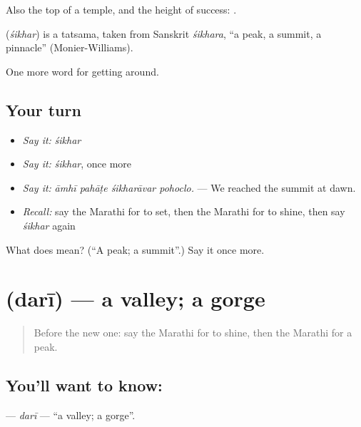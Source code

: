 Also the top of a temple, and the height of success:  .

\begin{cousinweb}
\textbf{} (\emph{śikhar}) is a tatsama, taken from Sanskrit \emph{śikhara}, \textquotedblleft{}a peak, a summit, a pinnacle\textquotedblright{} (Monier-Williams).
\end{cousinweb}

\begin{grammarlens}[title={What you've built}]
One more word for getting around.
\end{grammarlens}

\subsection*{Your turn}
\begin{itemize}
\raggedright
  \item \emph{Say it:} \emph{śikhar}
  \item \emph{Say it:} \emph{śikhar}, once more
  \item \emph{Say it:} \emph{āmhī pahāṭe śikharāvar pohoclo.} — We reached the summit at dawn.
  \item \emph{Recall:} say the Marathi for to set, then the Marathi for to shine, then say \emph{śikhar} again
\end{itemize}

\begin{tcolorbox}[breakable,colback=teal!4,colframe=teal!35!black,title={Before you move on}]
What does  mean? (\textquotedblleft{}A peak; a summit\textquotedblright{}.) Say it once more.
\end{tcolorbox}
\section[\texorpdfstring{\mr{दरी} (darī)}{दरी (darī)}]{ (darī) — a valley; a gorge}

\label{lesson:MR-C442-dari}



\begin{quote}
Before the new one: say the Marathi for to shine, then the Marathi for a peak.
\end{quote}

\subsection*{You'll want to know: }
\textbf{} — \emph{darī} — \textquotedblleft{}a valley; a gorge\textquotedblright{}.

